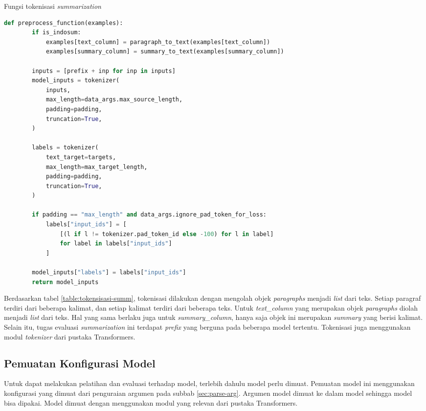\begin{table}[h]
    \caption{Fungsi tokenisasi \textit{summarization}}
    \label{table:tokensisasi-summ}
    \begin{lstlisting}[language=python]
    def preprocess_function(examples):
        if is_indosum:
            examples[text_column] = paragraph_to_text(examples[text_column])
            examples[summary_column] = summary_to_text(examples[summary_column])

        inputs = [prefix + inp for inp in inputs]
        model_inputs = tokenizer(
            inputs,
            max_length=data_args.max_source_length,
            padding=padding,
            truncation=True,
        )

        labels = tokenizer(
            text_target=targets,
            max_length=max_target_length,
            padding=padding,
            truncation=True,
        )

        if padding == "max_length" and data_args.ignore_pad_token_for_loss:
            labels["input_ids"] = [
                [(l if l != tokenizer.pad_token_id else -100) for l in label]
                for label in labels["input_ids"]
            ]

        model_inputs["labels"] = labels["input_ids"]
        return model_inputs
    \end{lstlisting}
\end{table}

Berdasarkan tabel \ref{table:tokensisasi-summ}, tokenisasi dilakukan dengan mengolah objek \textit{paragraphs} menjadi \textit{list} dari teks. Setiap paragraf terdiri dari beberapa kalimat, dan setiap kalimat terdiri dari beberapa teks. Untuk \textit{text\_column} yang merupakan objek \textit{paragraphs}  diolah menjadi \textit{list} dari teks. Hal yang sama berlaku juga untuk \textit{summary\_column}, hanya saja objek ini merupakan \textit{summary} yang berisi kalimat. Selain itu, tugas evaluasi \textit{summarization} ini terdapat \textit{prefix} yang berguna pada beberapa model tertentu. Tokenisasi juga menggunakan modul \textit{tokenizer} dari pustaka Transformers.

\subsection{Pemuatan Konfigurasi Model}

Untuk dapat melakukan pelatihan dan evaluasi terhadap model, terlebih dahulu model perlu dimuat. Pemuatan model ini menggunakan konfigurasi yang dimuat dari penguraian argumen pada subbab \ref{sec:parse-arg}. Argumen model  dimuat ke dalam model sehingga model bisa dipakai. Model  dimuat dengan menggunakan modul yang relevan dari pustaka Transformers.

